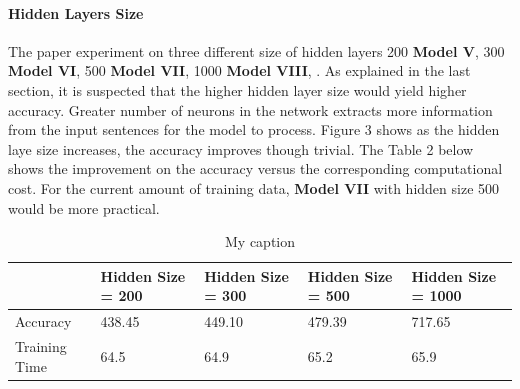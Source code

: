 \documentclass[10pt]{article}
\begin{document}
\paragraph{Hidden Layers Size}
The paper experiment on three different size of hidden layers 200 \textbf{Model V}, 300 \textbf{Model VI}, 500 \textbf{Model VII}, 1000 \textbf{Model VIII}, . As explained in the last section, it is suspected that the higher hidden layer size would yield higher accuracy. Greater number of neurons in the network extracts more information from the input sentences for the model to process. Figure 3 shows as the hidden laye size increases, the accuracy improves though trivial. 
The Table 2 below shows the improvement on the accuracy versus the corresponding computational cost. For the current amount of training data, \textbf{Model VII} with hidden size 500 would be more practical. 

\begin{table}[]
\centering
\caption{My caption}
\label{my-label}
\begin{tabular}{lllll}
\hline
         & Hidden Size = 200 & Hidden Size = 300 & Hidden Size = 500 & Hidden Size = 1000 \\ \hline
Accuracy & 438.45            & 449.10            & 479.39            & 717.65             \\
Training Time     & 64.5              & 64.9              & 65.2              & 65.9               \\ \hline
\end{tabular}
\end{table}
\end{document}
